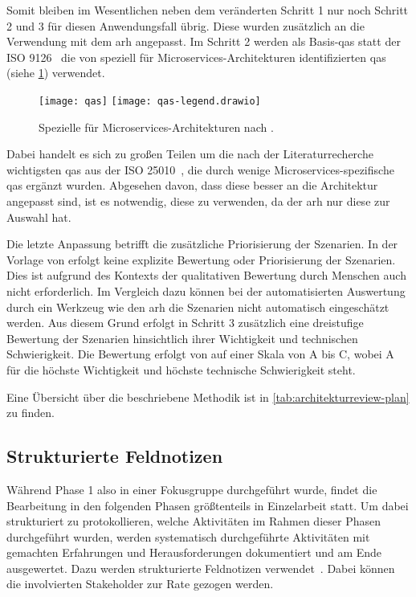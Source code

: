 Somit bleiben im Wesentlichen neben dem veränderten Schritt 1 nur noch Schritt 2 und 3 für diesen Anwendungsfall übrig.
Diese wurden zusätzlich an die Verwendung mit dem \gls{arh} angepasst.
Im Schritt 2 werden als Basis-\glspl{qa} statt der ISO 9126~\cite{ISO-9126} die von  speziell für Microservices-Architekturen identifizierten \glspl{qa} (siehe \cref{fig:qas}) verwendet.
\begin{figure}[!h]
	\centering
	\texttt{[image: qas]}
	\texttt{[image: qas-legend.drawio]}
	\caption[Spezielle  für Microservices-Architekturen]{
		Spezielle  für Microservices-Architekturen nach .
	}
	\label{fig:qas}
\end{figure}
Dabei handelt es sich zu großen Teilen um die nach der Literaturrecherche wichtigsten \glspl{qa} aus der ISO 25010~\cite{ISO-25010}, die durch wenige Microservices-spezifische \glspl{qa} ergänzt wurden.
Abgesehen davon, dass diese besser an die Architektur angepasst sind, ist es notwendig, diese zu verwenden, da der \gls{arh} nur diese zur Auswahl hat.

Die letzte Anpassung betrifft die zusätzliche Priorisierung der Szenarien.
In der Vorlage von  erfolgt keine explizite Bewertung oder Priorisierung der Szenarien.
Dies ist aufgrund des Kontexts der qualitativen Bewertung durch Menschen auch nicht erforderlich.
Im Vergleich dazu können bei der automatisierten Auswertung durch ein Werkzeug wie den \gls{arh} die Szenarien nicht automatisch eingeschätzt werden.
Aus diesem Grund erfolgt in Schritt 3 zusätzlich eine dreistufige Bewertung der Szenarien hinsichtlich ihrer Wichtigkeit und technischen Schwierigkeit.
Die Bewertung erfolgt von auf einer Skala von A bis C, wobei A für die höchste Wichtigkeit und höchste technische Schwierigkeit steht.

Eine Übersicht über die beschriebene Methodik ist in \cref{tab:architekturreview-plan} zu finden.



\subsection{Strukturierte Feldnotizen}
\label{sec:structured-field-notes}

Während Phase 1 also in einer Fokusgruppe durchgeführt wurde, findet die Bearbeitung in den folgenden Phasen größtenteils in Einzelarbeit statt.
Um dabei strukturiert zu protokollieren, welche Aktivitäten im Rahmen dieser Phasen durchgeführt wurden, werden systematisch durchgeführte Aktivitäten mit gemachten Erfahrungen und Herausforderungen dokumentiert und am Ende ausgewertet.
Dazu werden strukturierte Feldnotizen verwendet~\cite{seaman2008qualitative}.
Dabei können die involvierten Stakeholder zur Rate gezogen werden.


